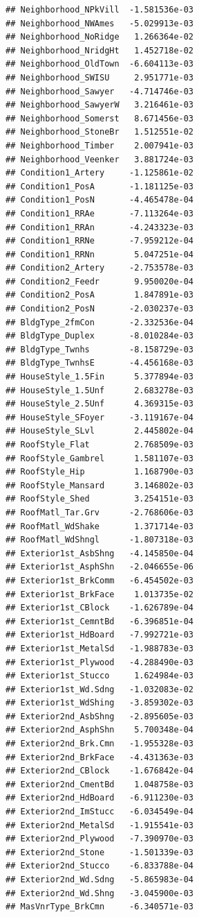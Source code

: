 \documentclass[
]{article}
\begin{document}
\begin{verbatim}
## Neighborhood_NPkVill  -1.581536e-03
## Neighborhood_NWAmes   -5.029913e-03
## Neighborhood_NoRidge   1.266364e-02
## Neighborhood_NridgHt   1.452718e-02
## Neighborhood_OldTown  -6.604113e-03
## Neighborhood_SWISU     2.951771e-03
## Neighborhood_Sawyer   -4.714746e-03
## Neighborhood_SawyerW   3.216461e-03
## Neighborhood_Somerst   8.671456e-03
## Neighborhood_StoneBr   1.512551e-02
## Neighborhood_Timber    2.007941e-03
## Neighborhood_Veenker   3.881724e-03
## Condition1_Artery     -1.125861e-02
## Condition1_PosA       -1.181125e-03
## Condition1_PosN       -4.465478e-04
## Condition1_RRAe       -7.113264e-03
## Condition1_RRAn       -4.243323e-03
## Condition1_RRNe       -7.959212e-04
## Condition1_RRNn        5.047251e-04
## Condition2_Artery     -2.753578e-03
## Condition2_Feedr       9.950020e-04
## Condition2_PosA        1.847891e-03
## Condition2_PosN       -2.030237e-03
## BldgType_2fmCon       -2.332536e-04
## BldgType_Duplex       -8.010284e-03
## BldgType_Twnhs        -8.158729e-03
## BldgType_TwnhsE       -4.456168e-03
## HouseStyle_1.5Fin      5.377894e-03
## HouseStyle_1.5Unf      2.683278e-03
## HouseStyle_2.5Unf      4.369315e-03
## HouseStyle_SFoyer     -3.119167e-04
## HouseStyle_SLvl        2.445802e-04
## RoofStyle_Flat         2.768509e-03
## RoofStyle_Gambrel      1.581107e-03
## RoofStyle_Hip          1.168790e-03
## RoofStyle_Mansard      3.146802e-03
## RoofStyle_Shed         3.254151e-03
## RoofMatl_Tar.Grv      -2.768606e-03
## RoofMatl_WdShake       1.371714e-03
## RoofMatl_WdShngl      -1.807318e-03
## Exterior1st_AsbShng   -4.145850e-04
## Exterior1st_AsphShn   -2.046655e-06
## Exterior1st_BrkComm   -6.454502e-03
## Exterior1st_BrkFace    1.013735e-02
## Exterior1st_CBlock    -1.626789e-04
## Exterior1st_CemntBd   -6.396851e-04
## Exterior1st_HdBoard   -7.992721e-03
## Exterior1st_MetalSd   -1.988783e-03
## Exterior1st_Plywood   -4.288490e-03
## Exterior1st_Stucco     1.624984e-03
## Exterior1st_Wd.Sdng   -1.032083e-02
## Exterior1st_WdShing   -3.859302e-03
## Exterior2nd_AsbShng   -2.895605e-03
## Exterior2nd_AsphShn    5.700348e-04
## Exterior2nd_Brk.Cmn   -1.955328e-03
## Exterior2nd_BrkFace   -4.431363e-03
## Exterior2nd_CBlock    -1.676842e-04
## Exterior2nd_CmentBd    1.048758e-03
## Exterior2nd_HdBoard   -6.911230e-03
## Exterior2nd_ImStucc   -6.034549e-04
## Exterior2nd_MetalSd   -1.915541e-03
## Exterior2nd_Plywood   -7.390970e-03
## Exterior2nd_Stone     -1.501339e-03
## Exterior2nd_Stucco    -6.833788e-04
## Exterior2nd_Wd.Sdng   -5.865983e-04
## Exterior2nd_Wd.Shng   -3.045900e-03
## MasVnrType_BrkCmn     -6.340571e-03

\end{verbatim}
\end{document}
